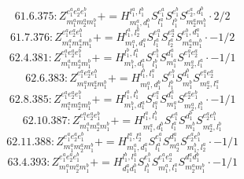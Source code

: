 \documentclass[letterpaper,10pt,fleqn,leqno,onecolumn]{article}
\begin{document}
\begin{equation} \;\;\;\;\;\;  61.6.375: Z^{e_{1}^{a}e_{2}^{a}e_{1}^{b}}_{m_{1}^{a}m_{2}^{a}m_{1}^{b}}+=H^{l_{1}^{a},l_{1}^{b}}_{m_{1}^{a},d_{1}^{b}}S^{e_{1}^{a}}_{l_{1}^{a}}S^{e_{1}^{b}}_{l_{1}^{b}}S^{e_{2}^{a},d_{1}^{b}}_{m_{2}^{a}m_{1}^{b}}\cdot 2/2 \end{equation}
\begin{equation} \;\;\;\;\;\;  61.7.376: Z^{e_{1}^{a}e_{2}^{a}e_{1}^{b}}_{m_{1}^{a}m_{2}^{a}m_{1}^{b}}+=H^{l_{1}^{a},l_{2}^{a}}_{m_{1}^{a},d_{1}^{a}}S^{e_{1}^{a}}_{l_{1}^{a}}S^{e_{2}^{a}}_{l_{2}^{a}}S^{e_{1}^{b},d_{1}^{a}}_{m_{2}^{a}m_{1}^{b}}\cdot -1/2 \end{equation}
\begin{equation} \;\;\;\;\;\;  62.4.381: Z^{e_{1}^{a}e_{2}^{a}e_{1}^{b}}_{m_{1}^{a}m_{2}^{a}m_{1}^{b}}+=H^{l_{1}^{b},l_{1}^{a}}_{m_{1}^{b},d_{1}^{a}}S^{e_{1}^{b}}_{l_{1}^{b}}S^{d_{1}^{a}}_{m_{1}^{a}}S^{e_{1}^{a}e_{2}^{a}}_{m_{2}^{a},l_{1}^{a}}\cdot -1/1 \end{equation}
\begin{equation} \;\;\;\;\;\;  62.6.383: Z^{e_{1}^{a}e_{2}^{a}e_{1}^{b}}_{m_{1}^{a}m_{2}^{a}m_{1}^{b}}+=H^{l_{1}^{b},l_{1}^{a}}_{m_{1}^{a},d_{1}^{b}}S^{e_{1}^{b}}_{l_{1}^{b}}S^{d_{1}^{b}}_{m_{1}^{b}}S^{e_{1}^{a}e_{2}^{a}}_{m_{2}^{a},l_{1}^{a}} \end{equation}
\begin{equation} \;\;\;\;\;\;  62.8.385: Z^{e_{1}^{a}e_{2}^{a}e_{1}^{b}}_{m_{1}^{a}m_{2}^{a}m_{1}^{b}}+=H^{l_{1}^{a},l_{1}^{b}}_{m_{1}^{b},d_{1}^{a}}S^{e_{1}^{a}}_{l_{1}^{a}}S^{d_{1}^{a}}_{m_{1}^{a}}S^{e_{2}^{a}e_{1}^{b}}_{m_{2}^{a},l_{1}^{b}}\cdot -1/1 \end{equation}
\begin{equation} \;\;\;\;\;\;  62.10.387: Z^{e_{1}^{a}e_{2}^{a}e_{1}^{b}}_{m_{1}^{a}m_{2}^{a}m_{1}^{b}}+=H^{l_{1}^{a},l_{1}^{b}}_{m_{1}^{a},d_{1}^{b}}S^{e_{1}^{a}}_{l_{1}^{a}}S^{d_{1}^{b}}_{m_{1}^{b}}S^{e_{2}^{a}e_{1}^{b}}_{m_{2}^{a},l_{1}^{b}} \end{equation}
\begin{equation} \;\;\;\;\;\;  62.11.388: Z^{e_{1}^{a}e_{2}^{a}e_{1}^{b}}_{m_{1}^{a}m_{2}^{a}m_{1}^{b}}+=H^{l_{1}^{a},l_{2}^{a}}_{m_{1}^{a},d_{1}^{a}}S^{e_{1}^{a}}_{l_{1}^{a}}S^{d_{1}^{a}}_{m_{2}^{a}}S^{e_{2}^{a}e_{1}^{b}}_{m_{1}^{b},l_{2}^{a}}\cdot -1/1 \end{equation}
\begin{equation} \;\;\;\;\;\;  63.4.393: Z^{e_{1}^{a}e_{2}^{a}e_{1}^{b}}_{m_{1}^{a}m_{2}^{a}m_{1}^{b}}+=H^{l_{1}^{b},l_{1}^{a}}_{d_{1}^{a}d_{1}^{b}}S^{e_{1}^{b}}_{l_{1}^{b}}S^{e_{1}^{a}e_{2}^{a}}_{m_{1}^{a},l_{1}^{a}}S^{d_{1}^{a}d_{1}^{b}}_{m_{2}^{a}m_{1}^{b}}\cdot -1/1 \end{equation}
\end{document}
